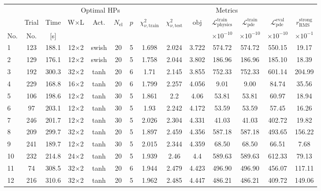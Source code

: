 \begin{tabular}{lcc cccc ccccccc}
\toprule
& & & \multicolumn{4}{c}{Optimal HPs} & \multicolumn{7}{c}{Metrics} \\
\cmidrule(lr){4-7}\cmidrule(lr){8-14}
& Trial & Time & W$\times$L & Act. & $N_{\mathrm{el}}$ & $p$ & $\chi^2_{\nu,\mathrm{train}}$ & $\chi^2_{\nu,\mathrm{test}}$ & $\mathrm{obj}$ & $\mathcal{L}_{\mathrm{physics}}^{\mathrm{train}}$ & $\mathcal{L}_{\mathrm{pde}}^{\mathrm{train}}$ & $\mathcal{L}_{\mathrm{pde}}^{\mathrm{eval}}$ & $r_{\mathrm{RMS}}^{\mathrm{strong}}$ \\
No. & No. & [s] &  &  &  &  &  &  &  & $\times 10^{-10}$ & $\times 10^{-10}$ & $\times 10^{-10}$ & $\times 10^{-1}$ \\
\midrule
  1 & 123 & 188.1 & 12$\times$2 & swish & 20 & 5 & \num{1.698} & \num{2.024} & \num{3.722} & 574.72 & 574.72 & 550.15 & 19.17 \\
  2 & 129 & 176.1 & 12$\times$2 & swish & 20 & 5 & \num{1.758} & \num{2.044} & \num{3.802} & 186.96 & 186.96 & 185.10 & 18.39 \\
  3 & 192 & 300.3 & 32$\times$2 & tanh & 20 & 6 & \num{1.71} & \num{2.145} & \num{3.855} & 752.33 & 752.33 & 601.14 & 204.99 \\
  4 & 229 & 168.8 & 16$\times$2 & tanh & 20 & 6 & \num{1.799} & \num{2.257} & \num{4.056} & 9.01 & 9.00 & 84.74 & 35.56 \\
  5 & 106 & 198.6 & 12$\times$2 & tanh & 30 & 5 & \num{1.861} & \num{2.2} & \num{4.06} & 53.81 & 53.81 & 60.97 & 18.94 \\
  6 & 97 & 203.1 & 12$\times$2 & tanh & 30 & 5 & \num{1.93} & \num{2.242} & \num{4.172} & 53.59 & 53.59 & 57.45 & 16.26 \\
  7 & 246 & 201.7 & 12$\times$2 & tanh & 30 & 5 & \num{2.026} & \num{2.304} & \num{4.331} & 41.03 & 41.03 & 402.72 & 19.82 \\
  8 & 209 & 299.7 & 32$\times$2 & tanh & 20 & 5 & \num{1.897} & \num{2.459} & \num{4.356} & 587.18 & 587.18 & 493.65 & 156.22 \\
  9 & 241 & 189.7 & 12$\times$2 & tanh & 30 & 5 & \num{2.015} & \num{2.344} & \num{4.359} & 68.50 & 68.50 & 66.51 & 7.68 \\
  10 & 232 & 214.8 & 24$\times$2 & tanh & 20 & 5 & \num{1.939} & \num{2.46} & \num{4.4} & 589.63 & 589.63 & 612.33 & 79.13 \\
  11 & 74 & 308.5 & 32$\times$2 & tanh & 20 & 6 & \num{1.944} & \num{2.479} & \num{4.423} & 496.90 & 496.90 & 456.07 & 117.11 \\
  12 & 216 & 310.6 & 32$\times$2 & tanh & 20 & 5 & \num{1.962} & \num{2.485} & \num{4.447} & 486.21 & 486.21 & 409.72 & 149.06 \\

\end{tabular}
